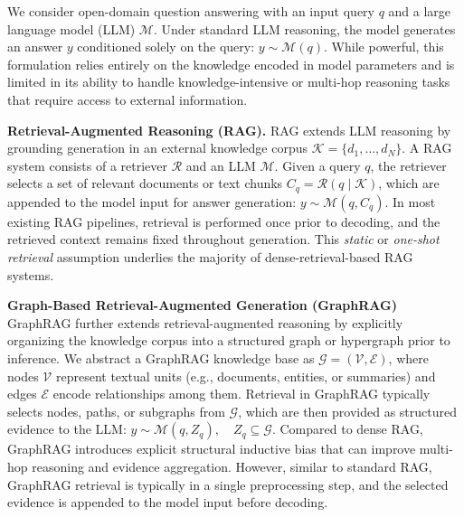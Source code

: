 



We consider open-domain question answering with an input query $q$ and a large language model (LLM) $\mathcal{M}$. Under standard LLM reasoning, the model generates an answer $y$ conditioned solely on the query: $y \sim \mathcal{M}(q).$
While powerful, this formulation relies entirely on the knowledge encoded in model parameters and is limited in its ability to handle knowledge-intensive or multi-hop reasoning tasks that require access to external information.

\noindent\textbf{Retrieval-Augmented Reasoning (RAG).}
RAG extends LLM reasoning by grounding generation in an external knowledge corpus $\mathcal{K}=\{d_1,\dots,d_N\}$. A RAG system consists of a retriever $\mathcal{R}$ and an LLM $\mathcal{M}$. Given a query $q$, the retriever selects a set of relevant documents or text chunks $C_q = \mathcal{R}(q \mid \mathcal{K})$,
which are appended to the model input for answer generation: $y \sim \mathcal{M}(q, C_q).$
In most existing RAG pipelines, retrieval is performed once prior to decoding, and the retrieved context remains fixed throughout generation. This \emph{static} or \emph{one-shot retrieval} assumption underlies the majority of dense-retrieval-based RAG systems.

\noindent\textbf{Graph-Based Retrieval-Augmented Generation (GraphRAG)}
GraphRAG further extends retrieval-augmented reasoning by explicitly organizing the knowledge corpus into a structured graph or hypergraph prior to inference. We abstract a GraphRAG knowledge base as $\mathcal{G} = (\mathcal{V}, \mathcal{E})$,
where nodes $\mathcal{V}$ represent textual units (e.g., documents, entities, or summaries) and edges $\mathcal{E}$ encode relationships among them. Retrieval in GraphRAG typically selects nodes, paths, or subgraphs from $\mathcal{G}$, which are then provided as structured evidence to the LLM: $y \sim \mathcal{M}(q, Z_q), \quad Z_q \subseteq \mathcal{G}$. Compared to dense RAG, GraphRAG introduces explicit structural inductive bias that can improve multi-hop reasoning and evidence aggregation. However, similar to standard RAG, GraphRAG retrieval is typically in a single preprocessing step, and the selected evidence is appended to the model input before decoding.

